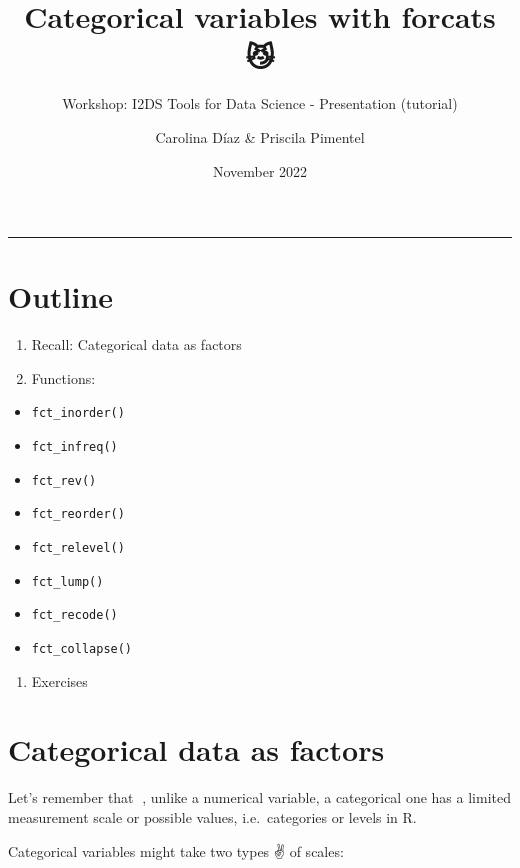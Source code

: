\documentclass[
]{article}
\title{Categorical variables with forcats 😼}
\subtitle{Workshop: I2DS Tools for Data Science - Presentation
(tutorial)}
\author{Carolina Díaz \& Priscila Pimentel}
\date{November 2022}
\providecommand{\tightlist}{%
  \setlength{\itemsep}{0pt}\setlength{\parskip}{0pt}}
\begin{document}
\maketitle

{
\setcounter{tocdepth}{2}
\tableofcontents
}
\begin{center}\rule{0.5\linewidth}{0.5pt}\end{center}

\hypertarget{outline}{%
\section{Outline}\label{outline}}

\begin{enumerate}
\def\labelenumi{\arabic{enumi}.}
\tightlist
\item
  Recall: Categorical data as factors
\item
  Functions:
\end{enumerate}

\begin{itemize}
\tightlist
\item
  \texttt{fct\_inorder()}
\item
  \texttt{fct\_infreq()}
\item
  \texttt{fct\_rev()}
\item
  \texttt{fct\_reorder()}
\item
  \texttt{fct\_relevel()}
\item
  \texttt{fct\_lump()}
\item
  \texttt{fct\_recode()}
\item
  \texttt{fct\_collapse()}
\end{itemize}

\begin{enumerate}
\def\labelenumi{\arabic{enumi}.}
\setcounter{enumi}{2}
\tightlist
\item
  Exercises
\end{enumerate}

\hypertarget{categorical-data-as-factors}{%
\section{Categorical data as
factors}\label{categorical-data-as-factors}}

Let's remember that 📖, unlike a numerical variable, a categorical one
has a limited measurement scale or possible values, i.e.~categories or
levels in R.

Categorical variables might take two types ✌️ of scales:
\end{document}
